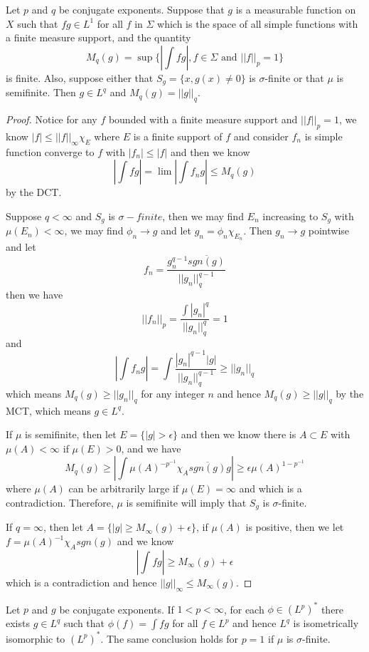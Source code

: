 \documentclass[lang=en, color=blue, ]{elegantbook}
\begin{document}
\begin{theorem}
    Let $p$ and $q$ be conjugate exponents. Suppose that $g$ is a measurable function on $X$ such that $fg\in L^1$ for all $f$ in $\Sigma$ which is the space of all simple functions with a finite measure support, and the quantity
    \[M_q(g) = \sup \{|\int fg|, f\in\Sigma\text{ and }||f||_p = 1\}\]
    is finite. Also, suppose either that $S_g = \{x, g(x)\neq 0\}$ is $\sigma$-finite or that $\mu$ is semifinite. Then $g\in L^q$ and $M_q(g) = ||g||_q$.
\end{theorem}
\begin{proof}\par
    Notice for any $f$ bounded with a finite measure support and $||f||_p = 1$, we know $|f| \leq ||f||_{\infty}\chi_E$ where $E$ is a finite support of $f$ and consider $f_n$ is simple function converge to $f$ with $|f_n| \leq |f|$ and then we know
    \[
    |\int fg| = \lim |\int f_ng| \leq M_q(g)
    \] 
    by the DCT.\par
    Suppose $q < \infty$ and $S_g$ is $\sigma-finite$, then we may find $E_n$ increasing to $S_g$ with $\mu(E_n) <\infty$, we may find $\phi_n \to g$ and let $g_n = \phi_n\chi_{E_n}$. Then $g_n \to g$ pointwise and let
    \[
    f_n = \dfrac{g_n^{q-1}\overline{sgn(g)}}{||g_n||_q^{q-1}}
    \]
    then we have
    \[
    ||f_n||_p = \dfrac{\int |g_n|^q}{||g_n||_q^q} = 1
    \]
    and
    \[
    |\int f_n g| = \int \dfrac{|g_n|^{q-1}|g|}{||g_n||_q^{q-1}} \geq ||g_n||_q
    \]
    which means $M_q(g) \geq ||g_n||_q$ for any integer $n$ and hence $M_q(g) \geq ||g||_q$ by the MCT, which means $g\in L^q$.\par
    If $\mu$ is semifinite, then let $E = \{|g|>\epsilon\}$ and then we know there is $A\subset E$ with $\mu(A) < \infty$ if $\mu(E)>0$, and we have
    \[
    M_q(g) \geq |\int \mu(A)^{-p^{-1}}\chi_A\overline{sgn(g)} g| \geq \epsilon\mu(A)^{1-p^{-1}}
    \]
    where $\mu(A)$ can be arbitrarily large if $\mu(E) = \infty$ and which is a contradiction. Therefore, $\mu$ is semifinite will imply that $S_g$ is $\sigma$-finite.\par
    If $q = \infty$, then let $A = \{|g|\geq M_{\infty}(g)+\epsilon\}$, if $\mu(A)$ is positive, then we let $f = \mu(A)^{-1}\chi_A sgn(g)$ and we know
    \[|\int fg| \geq M_{\infty}(g)+\epsilon\]
    which is a contradiction and hence $||g||_{\infty} \leq M_{\infty}(g)$.
\end{proof}

\begin{theorem}
    Let $p$ and $g$ be conjugate exponents. If $1<p < \infty$, for each $\phi \in (L^p)^*$ there exists $g\in L^q$ such that $\phi(f) = \int fg$ for all $f\in L^p$ and hence $L^q$ is isometrically isomorphic to $(L^p)^*$. The same conclusion holds for $p=1$ if $\mu$ is $\sigma$-finite.
\end{theorem}
\end{document}

